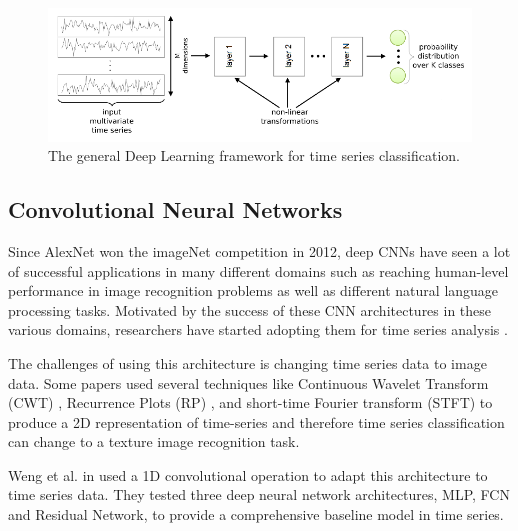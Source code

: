 \begin{figure}[H]
    \centering
    \begin{minipage}[b]{\textwidth}
        \includegraphics[width=\textwidth]{figures/project/app1.png}
    \end{minipage}
    \caption{The general Deep Learning framework for time series classification.}
    \label{fig:a1}
\end{figure}

\subsection{Convolutional Neural Networks}

Since AlexNet \cite{Krizhevsky2017ImageNetNetworks} won the imageNet competition in 2012, deep CNNs have seen a lot of successful applications in many different domains such as reaching human-level performance in image recognition problems as well as different natural language processing tasks. Motivated by the success of these CNN architectures in these various domains, researchers have started adopting them for time series analysis \cite{Gamboa2017DeepAnalysis}. 

The challenges of using this architecture is changing time series data to image data. Some papers used several techniques like Continuous Wavelet Transform (CWT) \cite{Wang2021AutomaticNetwork}, Recurrence Plots (RP) \cite{Hatami2017ClassificationNetworks}, and short-time Fourier transform (STFT) \cite{Huang2019ECGNetwork} to produce a 2D representation of time-series and therefore time series classification can change to a texture image recognition task.

Weng et al. in \cite{WangTimeBaseline} used a 1D convolutional operation to adapt this architecture to time series data. They tested three deep neural network architectures, MLP, FCN and Residual Network, to provide a comprehensive baseline model in time series.




